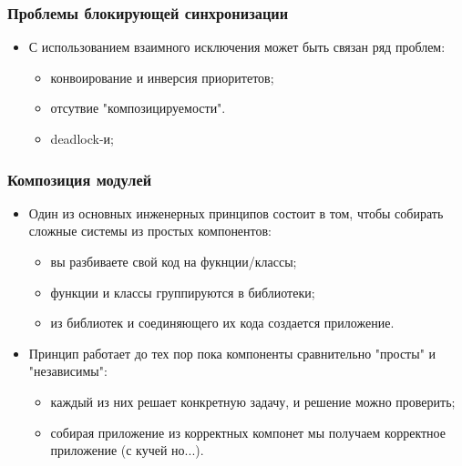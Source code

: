 \begin{frame}
\frametitle{Проблемы блокирующей синхронизации}
\begin{itemize}
  \item С использованием взаимного исключения может быть связан ряд проблем:
  \begin{itemize}
    \item конвоирование и инверсия приоритетов;
    \item отсутвие "композицируемости".
    \item deadlock-и;
  \end{itemize}
\end{itemize}
\end{frame}

\begin{frame}
\frametitle{Композиция модулей}
\begin{itemize}
  \item Один из основных инженерных принципов состоит в том, чтобы собирать
  сложные системы из простых компонентов:
  \begin{itemize}
    \item вы разбиваете свой код на фукнции/классы;
    \item функции и классы группируются в библиотеки;
    \item из библиотек и соединяющего их кода создается приложение.
  \end{itemize}
  \item Принцип работает до тех пор пока компоненты сравнительно "просты" и
  "независимы":
  \begin{itemize}
    \item каждый из них решает конкретную задачу, и решение можно проверить;
    \item собирая приложение из корректных компонет мы получаем корректное
    приложение (с кучей но...).
  \end{itemize}
\end{itemize}
\end{frame}

